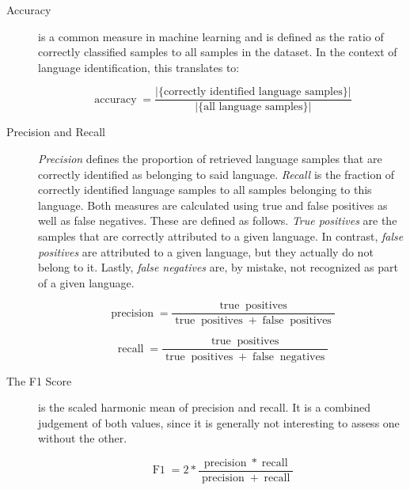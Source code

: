 \begin{description}
    \item[Accuracy] is a common measure in machine learning and is defined as the ratio of correctly classified samples to all samples in the dataset. In the context of language identification, this translates to:

	$$
	\operatorname{accuracy} = \frac{
	   \vert \{ \text{correctly identified language samples} \} \vert
	  }{
	   \vert \{ \text{all language samples} \} \vert
	  }
	$$

    \item[Precision and Recall] \emph{Precision} defines the proportion of retrieved language samples that are correctly identified as belonging to said language. \emph{Recall} is the fraction of correctly identified language samples to all samples belonging to this language. Both measures are calculated using true and false positives as well as false negatives. These are defined as follows. \emph{True positives} are the samples that are correctly attributed to a given language. In contrast, \emph{false positives} are attributed to a given language, but they actually do not belong to it. Lastly, \textit{false negatives} are, by mistake, not recognized as part of a given language.

	    $$
	    \operatorname{precision} = \frac
	      {\operatorname{true} \operatorname{positives}}
	      {\operatorname{true} \operatorname{positives} + \operatorname{false} \operatorname{positives}}
	    $$

		$$
		\operatorname{recall} = \frac
			{\operatorname{true} \operatorname{positives}}
			{\operatorname{true} \operatorname{positives} + \operatorname{false} \operatorname{negatives}}
		$$


    \item[The F1 Score] is the scaled harmonic mean of precision and recall. It is a combined judgement of both values, since it is generally not interesting to assess one without the other.

    	$$
    	\operatorname{F1} = 2 * \frac{\operatorname{precision} * \operatorname{recall}}{\operatorname{precision} + \operatorname{recall}}
    	$$

\end{description}

